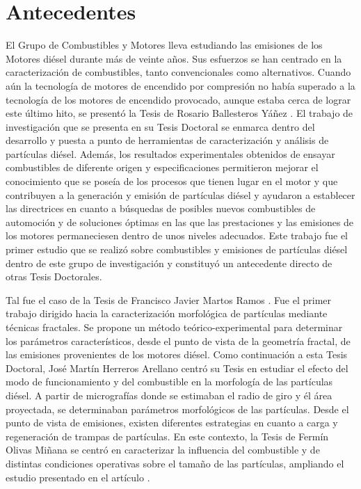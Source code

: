 \section{Antecedentes}\label{sec:Antecedentes}

\par El Grupo de Combustibles y Motores lleva estudiando las emisiones de los Motores diésel durante más de veinte años. Sus esfuerzos se han centrado en la caracterización de combustibles, tanto convencionales como alternativos. Cuando aún la tecnología de motores de encendido por compresión no había superado a la tecnología de los motores de encendido provocado, aunque estaba cerca de lograr este último hito, se presentó la Tesis de Rosario Ballesteros Yáñez \cite{chariphD:2002}. El trabajo de investigación que se presenta en su Tesis Doctoral se enmarca dentro del desarrollo y puesta a punto de herramientas de caracterización y análisis de partículas diésel. Además, los resultados experimentales obtenidos de ensayar combustibles de diferente origen y especificaciones permitieron mejorar el conocimiento que se poseía de los procesos que tienen lugar en el motor y que contribuyen a la generación y emisión de partículas diésel y ayudaron a establecer las directrices en cuanto a búsquedas de posibles nuevos combustibles de automoción y de soluciones óptimas en las que las prestaciones y las emisiones de los motores permaneciesen dentro de unos niveles adecuados. Este trabajo fue el primer estudio que se realizó sobre combustibles y emisiones de partículas diésel dentro de este grupo de investigación y constituyó un antecedente directo de otras Tesis Doctorales. 

\par Tal fue el caso de la Tesis de Francisco Javier Martos Ramos \cite{martosphD:2006}. Fue el primer trabajo dirigido hacia la caracterización morfológica de partículas mediante técnicas fractales. Se propone un método teórico-experimental para determinar los parámetros característicos, desde el punto de vista de la geometría fractal, de las emisiones provenientes de los motores diésel. Como continuación a esta Tesis Doctoral, José Martín Herreros Arellano \cite{martinphD:2009} centró su Tesis en estudiar el efecto del modo de funcionamiento y del combustible en la morfología de las partículas diésel. A partir de micrografías donde se estimaban el radio de giro y él área proyectada, se determinaban parámetros morfológicos de las partículas. Desde el punto de vista de emisiones, existen diferentes estrategias en cuanto a carga y regeneración de trampas de partículas. En este contexto, la Tesis de Fermín Olivas Miñana \cite{ferminphD:2012} se centró en caracterizar la influencia del combustible y de distintas condiciones operativas sobre el tamaño de las partículas, ampliando el estudio presentado en el artículo \cite{lapuertaetal:2007}.

